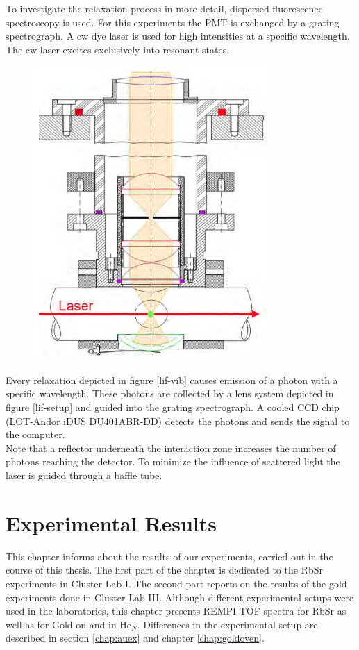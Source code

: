 \documentclass[parskip,12pt,headsepline,a4paper] {scrbook}
\begin{document}
To investigate the relaxation process in more detail, dispersed fluorescence spectroscopy is used. For this experiments the PMT is exchanged by a grating spectrograph. A cw dye laser is used for high intensities at a specific wavelength. The cw laser excites exclusively into resonant states.
\begin{figure}[ht]
\centerline{
\includegraphics[width=9cm]{./measuring_methods/lif-setup.jpg}}
\end{figure}
Every relaxation depicted in figure \ref{lif-vib} causes emission of a photon with a specific wavelength. These photons are collected by a lens system depicted in figure \ref{lif-setup} and guided into the grating spectrograph. A cooled CCD chip (LOT-Andor iDUS DU401ABR-DD) detects the photons and sends the signal to the computer. \\
Note that a reflector underneath the interaction zone increases the number of photons reaching the detector. To minimize the influence of scattered light the laser is guided through a baffle tube.


\chapter{Experimental Results}
\label{chap:results}
\vspace{-1\baselineskip}
This chapter informs about the results of our experiments, carried out in the course of this thesis. The first part of the chapter is dedicated to the RbSr experiments in Cluster Lab I. The second part reports on the results of the gold experiments done in Cluster Lab III. Although different experimental setups were used in the laboratories, this chapter presents REMPI-TOF spectra for RbSr as well as for Gold on and in He$_N$. Differences in the experimental setup are described in section \ref{chap:auex} and chapter \ref{chap:goldoven}.
\end{document}
